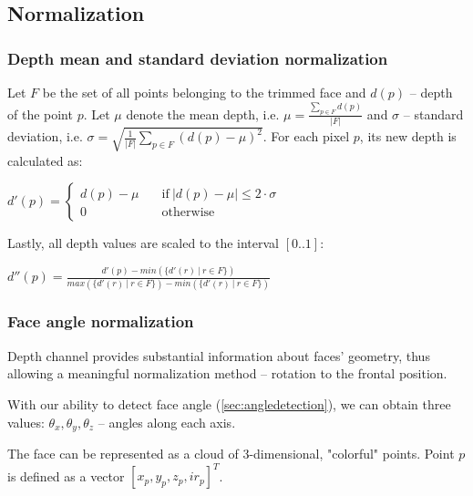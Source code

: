     \subsection{Normalization}
        \subsubsection*{Depth mean and standard deviation normalization}
        Let $F$ be the set of all points belonging to the trimmed face and
        $d(p)$ -- depth of the point $p$. Let $\mu$ denote the mean depth, i.e.
        $\mu = \frac{\sum\limits_{p \in F}{d(p)}}{|F|}$ and $\sigma$ -- standard
        deviation, i.e. $\sigma = \sqrt{\frac{1}{|F|} \sum\limits_{p \in F}{(d(p) - \mu)^2}}$.
        For each pixel $p$, its new depth is calculated as:

        \begin{center}
        $
          d'(p) = \begin{cases}
                  d(p) - \mu &\quad\text{if}\ |d(p) - \mu| \leqslant 2 \cdot \sigma \\
                  0 &\quad\text{otherwise}
                  \end{cases}
        $
        \end{center}


        Lastly, all depth values are scaled to the interval $[0..1]$:
        \begin{center}
        $
          d''(p) = \frac{d'(p) - min(\{d'(r)\ |\ r \in F\})}{max(\{d'(r)\ |\ r \in F\}) - min(\{d'(r)\ |\ r \in F\})}
        $
        \end{center}

        \subsubsection*{Face angle normalization}
        Depth channel provides substantial information about faces' geometry, thus allowing
        a meaningful normalization method -- rotation to the frontal position.

        With our ability to detect face angle (\ref{sec:angledetection}), we can obtain
        three values: $\theta_x, \theta_y, \theta_z$ -- angles along each axis.

        The face can be represented as a cloud of $3$-dimensional, "colorful" points.
        Point $p$ is defined as a vector $[x_p, y_p, z_p, ir_p]^{T}$.

